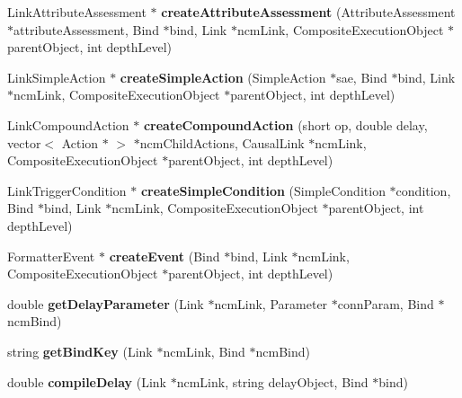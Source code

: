 \begin{CompactItemize}
\item 
LinkAttributeAssessment $\ast$ \textbf{createAttributeAssessment} (AttributeAssessment $\ast$attributeAssessment, Bind $\ast$bind, Link $\ast$ncmLink, CompositeExecutionObject $\ast$parentObject, int depthLevel)\label{classbr_1_1pucrio_1_1telemidia_1_1ginga_1_1ncl_1_1emconverter_1_1FormatterLinkConverter_9168514d5c101a07ad7bab3a79097caa}

\item 
LinkSimpleAction $\ast$ \textbf{createSimpleAction} (SimpleAction $\ast$sae, Bind $\ast$bind, Link $\ast$ncmLink, CompositeExecutionObject $\ast$parentObject, int depthLevel)\label{classbr_1_1pucrio_1_1telemidia_1_1ginga_1_1ncl_1_1emconverter_1_1FormatterLinkConverter_a54a89c9a4295af2d55091a40a2c0b1d}

\item 
LinkCompoundAction $\ast$ \textbf{createCompoundAction} (short op, double delay, vector$<$ Action $\ast$ $>$ $\ast$ncmChildActions, CausalLink $\ast$ncmLink, CompositeExecutionObject $\ast$parentObject, int depthLevel)\label{classbr_1_1pucrio_1_1telemidia_1_1ginga_1_1ncl_1_1emconverter_1_1FormatterLinkConverter_9247ceebe75c34d2f42247a1e7c99e45}

\item 
LinkTriggerCondition $\ast$ \textbf{createSimpleCondition} (SimpleCondition $\ast$condition, Bind $\ast$bind, Link $\ast$ncmLink, CompositeExecutionObject $\ast$parentObject, int depthLevel)\label{classbr_1_1pucrio_1_1telemidia_1_1ginga_1_1ncl_1_1emconverter_1_1FormatterLinkConverter_6ba6c87d71c2fd0678f206340cd2cb69}

\item 
FormatterEvent $\ast$ \textbf{createEvent} (Bind $\ast$bind, Link $\ast$ncmLink, CompositeExecutionObject $\ast$parentObject, int depthLevel)\label{classbr_1_1pucrio_1_1telemidia_1_1ginga_1_1ncl_1_1emconverter_1_1FormatterLinkConverter_7dead2bc2218b8ced528d05eacb486b0}

\item 
double \textbf{getDelayParameter} (Link $\ast$ncmLink, Parameter $\ast$connParam, Bind $\ast$ncmBind)\label{classbr_1_1pucrio_1_1telemidia_1_1ginga_1_1ncl_1_1emconverter_1_1FormatterLinkConverter_58a382238233f95814f7a0d75e1aba2a}

\item 
string \textbf{getBindKey} (Link $\ast$ncmLink, Bind $\ast$ncmBind)\label{classbr_1_1pucrio_1_1telemidia_1_1ginga_1_1ncl_1_1emconverter_1_1FormatterLinkConverter_aabfbe6013511eeae5bc6ce390e576b0}

\item 
double \textbf{compileDelay} (Link $\ast$ncmLink, string delayObject, Bind $\ast$bind)\label{classbr_1_1pucrio_1_1telemidia_1_1ginga_1_1ncl_1_1emconverter_1_1FormatterLinkConverter_0c02ee44c0e1b0d49d454b331336519d}

\end{CompactItemize}
